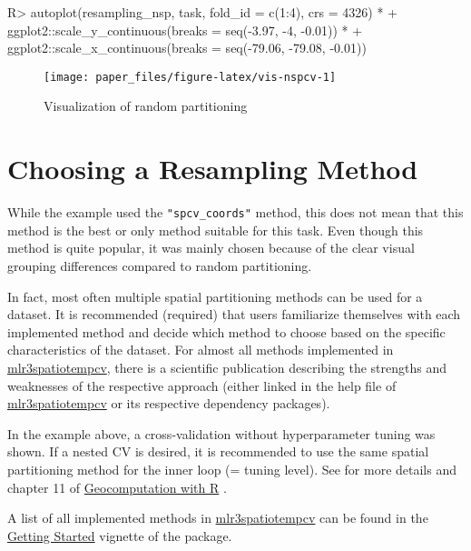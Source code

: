 \documentclass[
]{jss}
\begin{document}
\begin{CodeChunk}
\begin{CodeInput}
R> autoplot(resampling_nsp, task, fold_id = c(1:4), crs = 4326) *
+   ggplot2::scale_y_continuous(breaks = seq(-3.97, -4, -0.01)) *
+   ggplot2::scale_x_continuous(breaks = seq(-79.06, -79.08, -0.01))
\end{CodeInput}
\begin{figure}[!b]

{\centering \texttt{[image: paper\_files/figure-latex/vis-nspcv-1]} 

}

\caption[Visualization of random partitioning]{Visualization of random partitioning}\label{fig:vis-nspcv}
\end{figure}
\end{CodeChunk}

\hypertarget{choosing-a-resampling-method}{%
\section{Choosing a Resampling
Method}\label{choosing-a-resampling-method}}

While the example used the \texttt{"spcv\_coords"} method, this does not
mean that this method is the best or only method suitable for this task.
Even though this method is quite popular, it was mainly chosen because
of the clear visual grouping differences compared to random
partitioning.

In fact, most often multiple spatial partitioning methods can be used
for a dataset. It is recommended (required) that users familiarize
themselves with each implemented method and decide which method to
choose based on the specific characteristics of the dataset. For almost
all methods implemented in
\href{https://mlr3spatiotempcv.mlr-org.com}{mlr3spatiotempcv}, there is
a scientific publication describing the strengths and weaknesses of the
respective approach (either linked in the help file of
\href{https://mlr3spatiotempcv.mlr-org.com}{mlr3spatiotempcv} or its
respective dependency packages).

In the example above, a cross-validation without hyperparameter tuning
was shown. If a nested CV is desired, it is recommended to use the same
spatial partitioning method for the inner loop (= tuning level). See
\citet{schratz2019} for more details and chapter 11 of
\href{https://geocompr.robinlovelace.net/spatial-cv.html}{Geocomputation
with R} \citep{lovelace2019}.

A list of all implemented methods in
\href{https://mlr3spatiotempcv.mlr-org.com}{mlr3spatiotempcv} can be
found in the
\href{https://mlr3spatiotempcv.mlr-org.com/articles/mlr3spatiotempcv.html}{Getting
Started} vignette of the package.

\renewcommand\refname{References}

\end{document}
